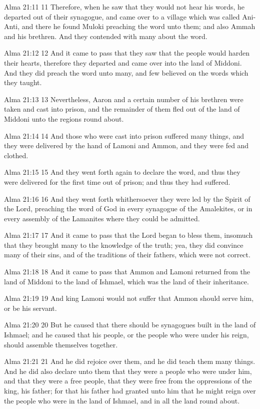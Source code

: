Alma 21:11
 11 Therefore, when he saw that they would not hear his words, he
departed out of their synagogue, and came over to a village which
was called Ani-Anti, and there he found Muloki preaching the word
unto them; and also Ammah and his brethren. And they contended
with many about the word.

Alma 21:12
 12 And it came to pass that they saw that the people would
harden their hearts, therefore they departed and came over into
the land of Middoni. And they did preach the word unto many, and
few believed on the words which they taught.

Alma 21:13
 13 Nevertheless, Aaron and a certain number of his brethren were
taken and cast into prison, and the remainder of them fled out of
the land of Middoni unto the regions round about.

Alma 21:14
 14 And those who were cast into prison suffered many things, and
they were delivered by the hand of Lamoni and Ammon, and they
were fed and clothed.

Alma 21:15
 15 And they went forth again to declare the word, and thus they
were delivered for the first time out of prison; and thus they
had suffered.

Alma 21:16
 16 And they went forth whithersoever they were led by the Spirit
of the Lord, preaching the word of God in every synagogue of the
Amalekites, or in every assembly of the Lamanites where they
could be admitted.

Alma 21:17
 17 And it came to pass that the Lord began to bless them,
insomuch that they brought many to the knowledge of the truth;
yea, they did convince many of their sins, and of the traditions
of their fathers, which were not correct.

Alma 21:18
 18 And it came to pass that Ammon and Lamoni returned from the
land of Middoni to the land of Ishmael, which was the land of
their inheritance.

Alma 21:19
 19 And king Lamoni would not suffer that Ammon should serve him,
or be his servant.

Alma 21:20
 20 But he caused that there should be synagogues built in the
land of Ishmael; and he caused that his people, or the people who
were under his reign, should assemble themselves together.

Alma 21:21
 21 And he did rejoice over them, and he did teach them many
things. And he did also declare unto them that they were a
people who were under him, and that they were a free people, that
they were free from the oppressions of the king, his father; for
that his father had granted unto him that he might reign over the
people who were in the land of Ishmael, and in all the land round
about.

